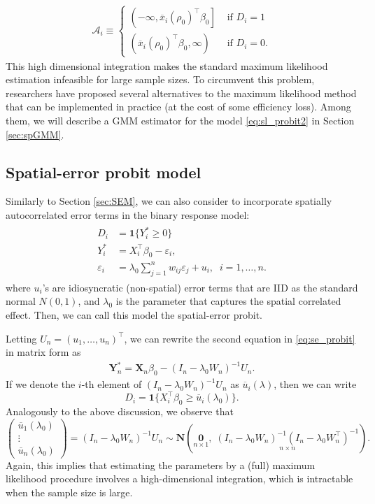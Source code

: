 \documentclass[10.5pt, A4paper, openany, uplatex]{book}
\newcommand{\mbf}{\mathbf}
\newcommand{\mcl}{\mathcal}
\newcommand{\eps}{\varepsilon}
\renewcommand{\bar}{\overline}
\numberwithin{equation}{section}
\begin{document}
\begin{align*}
	\mcl{A}_i \equiv \left\{
	\begin{array}{cl}
	\left(-\infty, \bar x_i(\rho_0)^\top \beta_0 \right] & \text{ if } D_i = 1 \\
	\left(\bar x_i(\rho_0)^\top \beta_0, \infty \right)  & \text{ if } D_i = 0.
	\end{array}\right.
\end{align*}
This high dimensional integration makes the standard maximum likelihood estimation infeasible for large sample sizes.
To circumvent this problem, researchers have proposed several alternatives to the maximum likelihood method that can be implemented in practice (at the cost of some efficiency loss).
Among them, we will describe a GMM estimator for the model \eqref{eq:sl_probit2} in Section \ref{sec:spGMM}.

\subsection{Spatial-error probit model}

Similarly to Section \ref{sec:SEM}, we can also consider to incorporate spatially autocorrelated error terms in the binary response model:
\begin{align}\label{eq:se_probit}
\begin{split}
	D_i & = \mathbf{1}\{Y^*_i \geq 0\}\\
	Y^*_i & = X_i^\top \beta_0 - \eps_i, \\
	\eps_i & = \lambda_0  \sum_{j = 1}^n w_{ij} \eps_j + u_i, \;\; i = 1, \ldots , n.
\end{split}
\end{align}
where $u_i$'s are idiosyncratic (non-spatial) error terms that are IID as the standard normal $N(0,1)$, and $\lambda_0$ is the parameter that captures the spatial correlated effect.
Then, we can call this model the spatial-error probit.

Letting $U_n = (u_1, \ldots, u_n)^\top$, we can rewrite the second equation in \eqref{eq:se_probit} in matrix form as
\begin{align*}
	\mbf{Y}^*_n = \mbf{X}_n \beta_0 - (I_n - \lambda_0 W_n)^{-1}U_n.
\end{align*}
If we denote the $i$-th element of $(I_n - \lambda_0 W_n)^{-1}U_n$ as $\bar u_i(\lambda)$, then we can write
\[
	D_i = \mbf{1}\{ X_i^\top \beta_0 \geq  \bar u_i(\lambda_0)\}.
\]
Analogously to the above discussion, we observe that
\[
\left( \begin{array}{c}
\bar u_1(\lambda_0) \\
\vdots \\
\bar u_n(\lambda_0)
\end{array} \right) = (I_n - \lambda_0 W_n)^{-1}U_n \sim \mbf{N}\left(\underset{n \times 1}{\mbf{0}}, \; \underset{n \times n}{(I_n - \lambda_0 W_n)^{-1}(I_n - \lambda_0 W_n^\top )^{-1}}\right).
\]
Again, this implies that estimating the parameters by a (full) maximum likelihood procedure involves a high-dimensional integration, which is intractable when the sample size is large.
\end{document}
